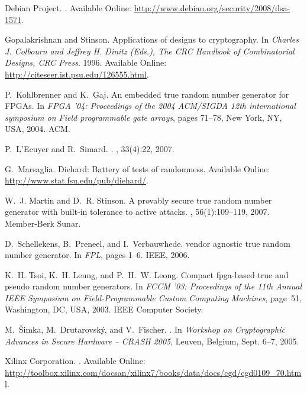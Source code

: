 \documentclass[conference]{IEEEtran}
\begin{document}


\begin{thebibliography}{10}

{Debian Project}.
.
\newblock Available Online: \url{http://www.debian.org/security/2008/dsa-1571}.

Gopalakrishnan and Stinson.
\newblock Applications of designs to cryptography.
\newblock In {\em Charles J. Colbourn and Jeffrey H. Dinitz (Eds.), The {CRC}
  Handbook of Combinatorial Designs, {CRC} Press}. 1996.
\newblock Available Online: \url{http://citeseer.ist.psu.edu/126555.html}.

P.~Kohlbrenner and K.~Gaj.
\newblock An embedded true random number generator for {FPGAs}.
\newblock In {\em FPGA '04: Proceedings of the 2004 ACM/SIGDA 12th
  international symposium on Field programmable gate arrays}, pages 71--78, New
  York, NY, USA, 2004. ACM.

P.~L'Ecuyer and R.~Simard.
.
, 33(4):22, 2007.

G.~Marsaglia.
\newblock Diehard: Battery of tests of randomness.
\newblock Available Online: \url{http://www.stat.fsu.edu/pub/diehard/}.

W.~J. Martin and D.~R. Stinson.
\newblock A provably secure true random number generator with built-in
  tolerance to active attacks.
, 56(1):109--119, 2007.
\newblock Member-Berk Sunar.

D.~Schellekens, B.~Preneel, and I.~Verbauwhede.
 vendor agnostic true random number generator.
\newblock In {\em FPL}, pages 1--6. IEEE, 2006.

K.~H. Tsoi, K.~H. Leung, and P.~H.~W. Leong.
\newblock Compact fpga-based true and pseudo random number generators.
\newblock In {\em FCCM '03: Proceedings of the 11th Annual IEEE Symposium on
  Field-Programmable Custom Computing Machines}, page~51, Washington, DC, USA,
  2003. IEEE Computer Society.

M.~\v{S}imka, M.~Drutarovsk\'y, and V.~Fischer.
.
\newblock In {\em Workshop on Cryptographic Advances in Secure Hardware --
  CRASH 2005}, Leuven, Belgium, Sept. 6--7, 2005.

{Xilinx Corporation}.
.
\newblock Available Online:
  \url{http://toolbox.xilinx.com/docsan/xilinx7/books/data/docs/cgd/cgd0109_70.html}.

\end{thebibliography}
\end{document}
